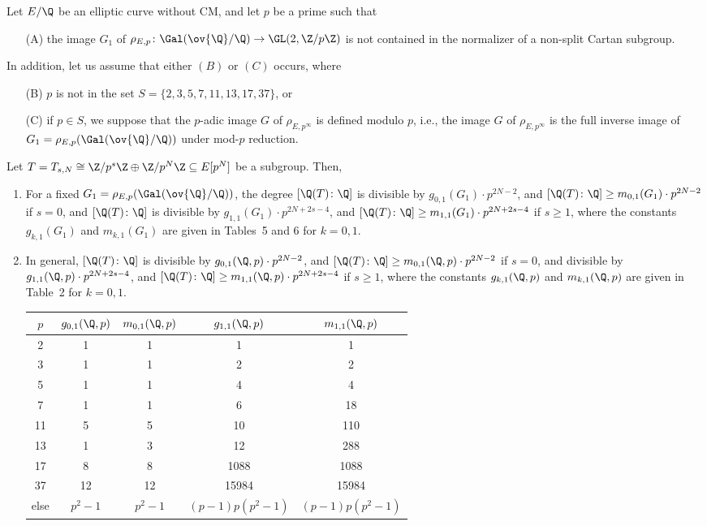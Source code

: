 \begin{thm} %
Let $E/\Q$ be an elliptic curve without CM, and let $p$ be a prime such that
	\begin{enumerate}
	\item[(A)] the image $G_1$ of $\rho_{E,p} \colon \Gal(\ov{\Q}/\Q) \to \GL(2,\Z/p\Z)$ is not contained in the normalizer of a non-split Cartan subgroup.	
	\end{enumerate}
In addition, let us assume that either $(B)$ or $(C)$ occurs, where
	\begin{enumerate}
	\item[(B)] $p$ is not in the set $S= \{ 2,3,5,7,11,13,17,37\}$, or
	\item[(C)] if $p \in S$, we suppose that the $p$-adic image $G$ of $\rho_{E,p^\infty}$ is defined modulo $p$, i.e., the image $G$ of $\rho_{E,p^\infty}$ is the full inverse image of $G_1= \rho_{E,p}(\Gal(\ov{\Q}/\Q))$ under mod-$p$ reduction.
	\end{enumerate}
Let $T= T_{s,N} \cong \Z/p^s\Z \oplus \Z/p^N\Z \subseteq E[p^N]$ be a subgroup. Then,
	\begin{enumerate}[(1)]
	\item For a fixed $G_1= \rho_{E,p}(\Gal(\ov{\Q}/\Q))$, the degree $[\Q(T) \colon \Q]$ is divisible by $g_{0,1}(G_1) \cdot p^{2N - 2}$, and $[\Q(T) \colon \Q] \geq m_{0,1}(G_1) \cdot p^{2N - 2}$ if $s= 0$, and $[\Q(T) \colon \Q]$ is divisible by $g_{1,1}(G_1) \cdot p^{2N + 2s - 4}$, and $[\Q(T) \colon \Q] \geq m_{1,1}(G_1) \cdot p^{2N + 2s - 4}$ if $s \geq 1$, where the constants $g_{k,1}(G_1)$ and $m_{k,1}(G_1)$ are given in Tables~5 and 6 for $k= 0,1$. 
	\item In general, $[\Q(T) \colon \Q]$ is divisible by $g_{0,1}(\Q,p) \cdot p^{2N - 2}$, and $[\Q(T) \colon \Q] \geq m_{0,1}(\Q,p) \cdot p^{2N - 2}$ if $s= 0$, and divisible by $g_{1,1}(\Q,p) \cdot p^{2N + 2s - 4}$, and $[\Q(T) \colon \Q] \geq m_{1,1}(\Q,p) \cdot p^{2N + 2s - 4}$ if $s \geq 1$, where the constants $g_{k,1}(\Q,p)$ and $m_{k,1}(\Q,p)$ are given in Table~2 for $k= 0,1$. 
		\begin{table}[!ht] %
		\centering
		\begin{tabular}{c|cc|cc} \hline
		$p$ & $g_{0,1}(\Q,p)$ & $m_{0,1}(\Q,p)$ & $g_{1,1}(\Q,p)$ & $m_{1,1}(\Q,p)$ \\ \hline
		2 & 1 & 1 & 1 & 1 \\ 
		3 & 1 & 1 & 2 & 2 \\
		5 & 1 & 1 & 4 & 4 \\
		7 & 1 & 1 & 6 & 18 \\
		11 & 5 & 5 & 10 & 110 \\
		13 & 1 & 3 & 12 & 288 \\
		17 & 8 & 8 & 1088 & 1088 \\
		37 & 12 & 12 & 15984 & 15984 \\
		else & $p^2 - 1$ & $p^2 - 1$ & $(p-1)p(p^2 - 1)$ & $(p - 1)p(p^2 - 1)$ \\ \hline
		\end{tabular}
		\end{table}
	\end{enumerate}
\end{thm}


